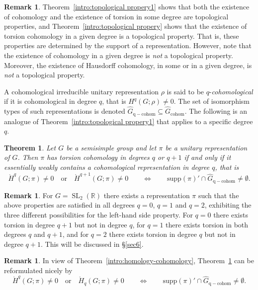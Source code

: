 \documentclass[12pt,reqno]{amsart}
\newcommand{\R}{\mathbb{R}}
\newtheorem{mainthm}{Theorem}
\theoremstyle{definition}
\newtheorem{remark}[theorem]{Remark}
\newcommand{\SL}{\operatorname{SL}}
\newcommand{\torH}{\mathring{H}}
\begin{document}
\begin{remark}
Theorem~\ref{intro:topological propery1} shows that both the existence of cohomology and the existence of torsion in some degree are topological properties, and Theorem~\ref{intro:topological propery} shows that the existence of torsion cohomology in a given degree is a topological property.
That is, these properties are determined by the support of a representation.
However, note that the existence of cohomology in a given degree is \emph{not} a topological property. Moreover, the existence of Hausdorff cohomology, in some or in a given degree, is \emph{not} a topological property.
\end{remark}

A cohomological irreducible unitary representation $\rho$ is said to be $q$-\emph{cohomological} if it is cohomological in degree $q$, that is $H^q(G;\rho) \ne 0$. The set of isomorphism types of such representations is denoted $\widehat{G}_{\mathrm{q-cohom}} \subseteq \widehat{G}_{\mathrm{cohom}}$.
The following is an analogue of Theorem~\ref{intro:topological propery1} that applies to a specific degree $q$.

\begin{mainthm}\label{intro: main thm2}
    Let $G$ be a semisimple group and let $\pi$ be a unitary representation of $G$.
    Then $\pi$ has torsion cohomology in degrees $q$ or $q+1$ if and only if it essentially weakly contains a cohomological representation in degree $q$, that is 
    \[ \torH^q(G;\pi)\neq 0 \quad \mbox{or} \quad \torH^{q+1}(G;\pi)\neq 0 \qquad \Longleftrightarrow \qquad \mathrm{supp}(\pi)' \cap \widehat{G}_{\mathrm{q-cohom}} \neq \emptyset.  \]
\end{mainthm}

\begin{remark}
    For $G=\SL_2(\R)$ there exists a representation $\pi$ such that the above properties are satisfied in all degrees $q=0$, $q=1$ and $q=2$, 
    exhibiting the three different possibilities for the left-hand side property. For $q=0$ there exists torsion in degree $q+1$ but not in degree $q$, for $q=1$ there exists torsion in both degrees $q$ and $q+1$, and 
    for $q=2$ there exists torsion in degree $q$ but not in degree $q+1$.
    This will be discussed in \S\ref{sec6}.
\end{remark}

\begin{remark}
In view of Theorem~\ref{intro:homology-cohomology}, Theorem~\ref{intro: main thm2} can be reformulated nicely by  
 \[ \torH^q(G;\pi)\neq 0 \quad \mbox{or} \quad \torH_{q}(G;\pi)\neq 0 \qquad \Longleftrightarrow \qquad \mathrm{supp}(\pi)' \cap \widehat{G}_{\mathrm{q-cohom}} \neq \emptyset.  \]
\end{remark}
\end{document}
